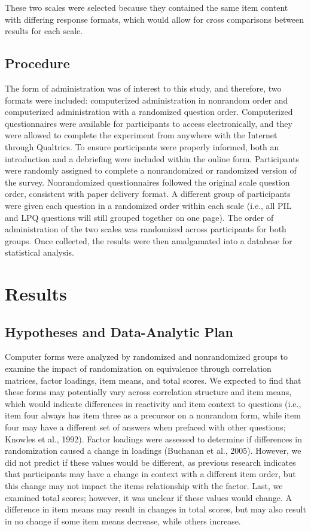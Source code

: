 \documentclass[english,man]{apa6}
\theoremstyle{definition}
\theoremstyle{definition}
\theoremstyle{definition}
\theoremstyle{remark}
\begin{document}
These two scales were selected because they contained the same item
content with differing response formats, which would allow for cross
comparisons between results for each scale.

\subsection{Procedure}\label{procedure}

The form of administration was of interest to this study, and therefore,
two formats were included: computerized administration in nonrandom
order and computerized administration with a randomized question order.
Computerized questionnaires were available for participants to access
electronically, and they were allowed to complete the experiment from
anywhere with the Internet through Qualtrics. To ensure participants
were properly informed, both an introduction and a debriefing were
included within the online form. Participants were randomly assigned to
complete a nonrandomized or randomized version of the survey.
Nonrandomized questionnaires followed the original scale question order,
consistent with paper delivery format. A different group of participants
were given each question in a randomized order within each scale (i.e.,
all PIL and LPQ questions will still grouped together on one page). The
order of administration of the two scales was randomized across
participants for both groups. Once collected, the results were then
amalgamated into a database for statistical analysis.

\section{Results}\label{results}

\subsection{Hypotheses and Data-Analytic
Plan}\label{hypotheses-and-data-analytic-plan}

Computer forms were analyzed by randomized and nonrandomized groups to
examine the impact of randomization on equivalence through correlation
matrices, factor loadings, item means, and total scores. We expected to
find that these forms may potentially vary across correlation structure
and item means, which would indicate differences in reactivity and item
context to questions (i.e., item four always has item three as a
precursor on a nonrandom form, while item four may have a different set
of answers when prefaced with other questions; Knowles et al., 1992).
Factor loadings were assessed to determine if differences in
randomization caused a change in loadings (Buchanan et al., 2005).
However, we did not predict if these values would be different, as
previous research indicates that participants may have a change in
context with a different item order, but this change may not impact the
items relationship with the factor. Last, we examined total scores;
however, it was unclear if these values would change. A difference in
item means may result in changes in total scores, but may also result in
no change if some item means decrease, while others increase.
\end{document}
